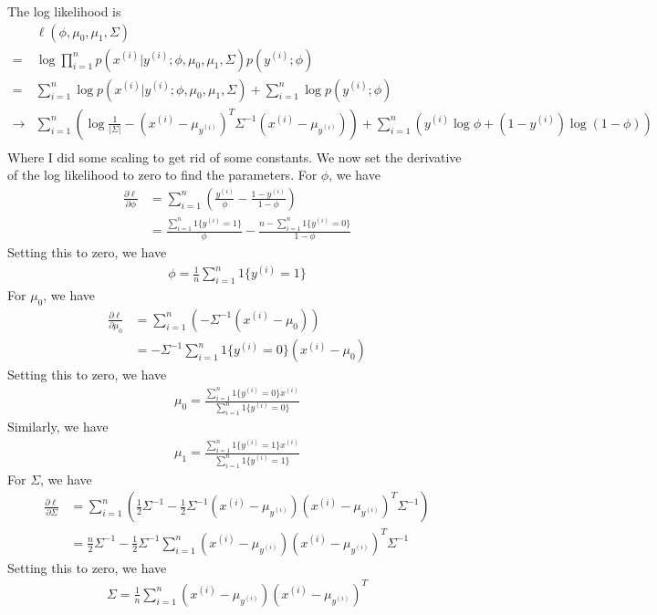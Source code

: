 \begin{answer}
    The log likelihood is
    \begin{align*}
        & \ell(\phi,\mu_0,\mu_1,\Sigma) \\
        =& \log \prod_{i=1}^{n} p(x^{(i)}|y^{(i)};\phi,\mu_0,\mu_1,\Sigma)p(y^{(i)};\phi) \\
        =& \sum_{i=1}^{n} \log p(x^{(i)}|y^{(i)};\phi,\mu_0,\mu_1,\Sigma) + \sum_{i=1}^{n} \log p(y^{(i)};\phi) \\
        \rightarrow& \sum_{i=1}^{n} \left( \log \frac{1}{|\Sigma|} - (x^{(i)}-\mu_{y^{(i)}})^T\Sigma^{-1}(x^{(i)}-\mu_{y^{(i)}}) \right) + \sum_{i=1}^{n} \left( y^{(i)} \log \phi + (1-y^{(i)}) \log (1-\phi) \right) \\
    \end{align*}
    Where I did some scaling to get rid of some constants.
    We now set the derivative of the log likelihood to zero to find the parameters.
    For $\phi$, we have
    \begin{align*}
        \frac{\partial \ell}{\partial \phi} &= \sum_{i=1}^{n} \left( \frac{y^{(i)}}{\phi} - \frac{1-y^{(i)}}{1-\phi} \right) \\
        &= \frac{\sum_{i=1}^{n}1\{y^{(i)} = 1\}}{\phi} - \frac{n - \sum_{i=1}^{n}1\{y^{(i)} = 0\}}{1-\phi}
    \end{align*}
    Setting this to zero, we have
    \begin{align*}
        \phi = \frac{1}{n} \sum_{i=1}^{n} 1\{y^{(i)} = 1\}
    \end{align*}
    For $\mu_0$, we have
    \begin{align*}
        \frac{\partial \ell}{\partial \mu_0} &= \sum_{i=1}^{n} \left( -\Sigma^{-1}(x^{(i)}-\mu_0) \right) \\
        &= -\Sigma^{-1} \sum_{i=1}^{n} 1\{y^{(i)} = 0\} (x^{(i)}-\mu_0)
    \end{align*}
    Setting this to zero, we have
    \begin{align*}
        \mu_0 = \frac{\sum_{i=1}^{n} 1\{y^{(i)} = 0\} x^{(i)}}{\sum_{i=1}^{n} 1\{y^{(i)} = 0\}}
    \end{align*}
    Similarly, we have
    \begin{align*}
        \mu_1 = \frac{\sum_{i=1}^{n} 1\{y^{(i)} = 1\} x^{(i)}}{\sum_{i=1}^{n} 1\{y^{(i)} = 1\}}
    \end{align*}
    For $\Sigma$, we have
    \begin{align*}
        \frac{\partial \ell}{\partial \Sigma} &= \sum_{i=1}^{n} \left( \frac{1}{2} \Sigma^{-1} - \frac{1}{2} \Sigma^{-1} (x^{(i)}-\mu_{y^{(i)}})(x^{(i)}-\mu_{y^{(i)}})^T \Sigma^{-1} \right) \\
        &= \frac{n}{2} \Sigma^{-1} - \frac{1}{2} \Sigma^{-1} \sum_{i=1}^{n} (x^{(i)}-\mu_{y^{(i)}})(x^{(i)}-\mu_{y^{(i)}})^T \Sigma^{-1}
    \end{align*}
    Setting this to zero, we have
    \begin{align*}
        \Sigma = \frac{1}{n} \sum_{i=1}^{n} (x^{(i)}-\mu_{y^{(i)}})(x^{(i)}-\mu_{y^{(i)}})^T
    \end{align*}
\end{answer}
